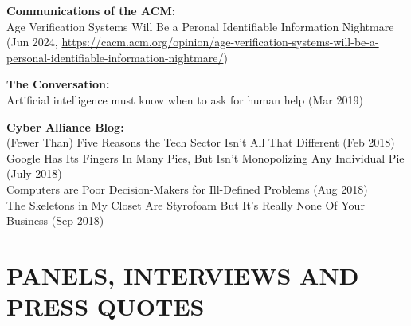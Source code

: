 \documentclass{res}
\begin{document}
\begin{resume}
\textbf{Communications of the ACM:} \\
    Age Verification Systems Will Be a Peronal Identifiable Information Nightmare (Jun 2024, \url{https://cacm.acm.org/opinion/age-verification-systems-will-be-a-personal-identifiable-information-nightmare/})

\textbf{The Conversation:} \\         
    Artificial intelligence must know when to ask for human help (Mar 2019) 

\textbf{Cyber Alliance Blog:} \\         
    (Fewer Than) Five Reasons the Tech Sector Isn't All That Different (Feb 2018) \\
    Google Has Its Fingers In Many Pies, But Isn't Monopolizing Any Individual Pie (July 2018) \\
    Computers are Poor Decision-Makers for Ill-Defined Problems (Aug 2018) \\
    The Skeletons in My Closet Are Styrofoam But It's Really None Of Your Business (Sep 2018) 


\section{PANELS, INTERVIEWS AND PRESS QUOTES}
\vspace{0.25in}


\end{resume}
\end{document}
